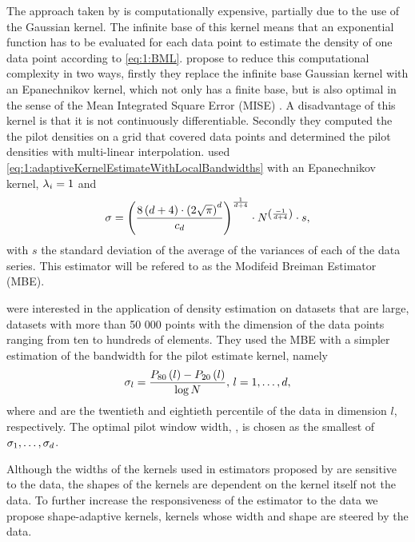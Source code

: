 The approach taken by \citeauthor{breiman1977variable} is computationally expensive, partially due to the use of the Gaussian kernel. The infinite base of this kernel means that an exponential function has to be evaluated for each data point to estimate the density of one data point according to \cref{eq:1:BML}. \textcite{wilkinson1995dataplot} propose to reduce this computational complexity in two ways, firstly they replace the infinite base Gaussian kernel with an Epanechnikov kernel, which not only has a finite base, but is also optimal in the sense of the Mean Integrated Square Error (MISE) \cite{epanechnikov1969non}. A disadvantage of this kernel is that it is not continuously differentiable. Secondly they computed the the pilot densities on a grid that covered data points and determined the pilot densities with multi-linear interpolation. \citeauthor{wilkinson1995dataplot} used \cref{eq:1:adaptiveKernelEstimateWithLocalBandwidths} with an Epanechnikov kernel, $\lambda_{i} = 1$ and 
	\begin{equation}\label{eq:1:wilkinsonHOpt}
		\sigma = \left(\frac{8\left(d + 4\right) \cdot \left(2 \sqrt{\pi}\right)^d}{c_d}\right)^{\frac{1}{d + 4}}\cdot N^{\left(\frac{-1}{d + 4}\right)} \cdot s,
	\end{equation}
with $s$ the standard deviation of the average of the variances of each of the data series. This estimator will be refered to as the Modifeid Breiman Estimator (MBE). 

\textcite{ferdosi2011comparison} were interested in the application of density estimation on datasets that are large, \ie datasets with more than 50 000 points with the dimension of the data points ranging from ten to hundreds of elements. They used the MBE with a simpler estimation of the bandwidth for the pilot estimate kernel, namely 
	\begin{equation}
		\sigma_l = \frac{P_{80}\left( l \right) - P_{20}\left( l \right)}{\log N}, \, l = 1, \dotsc, d,
	\end{equation}
where  and  are the twentieth and eightieth percentile of the data in dimension $l$, respectively. 
The optimal pilot window width, \varBandwidth, is chosen as the smallest of $\sigma_1, \dotsc, \sigma_d$.

Although the widths of the kernels used in estimators proposed by \citeauthor{breiman1977variable,wilkinson1995dataplot} are sensitive to the data, the shapes of the kernels are dependent on the kernel itself not the data. To further increase the responsiveness of the estimator to the data we propose shape-adaptive kernels, kernels whose width and shape are steered by the data. 

